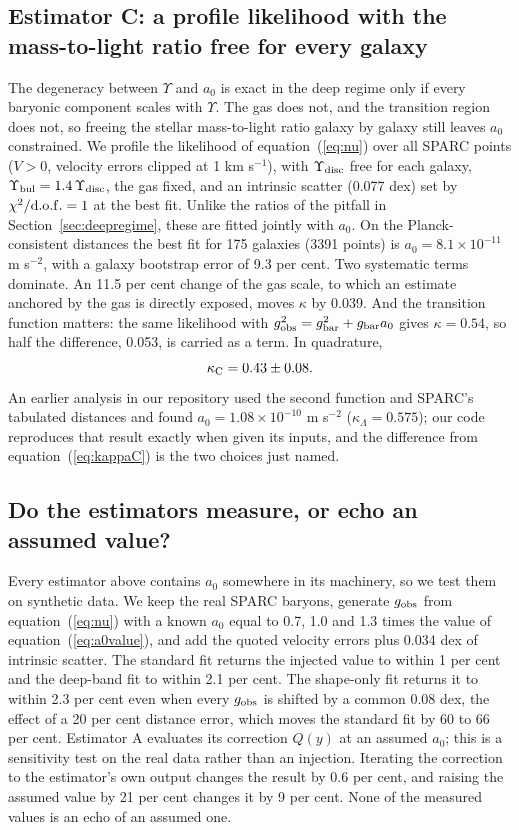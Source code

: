 \documentclass[fleqn,usenatbib]{mnras}
\begin{document}
\subsection{Estimator C: a profile likelihood with the mass-to-light ratio free for every galaxy}
\label{sec:profile}
The degeneracy between $\Upsilon$ and $a_0$ is exact in the deep regime only if every baryonic component scales with $\Upsilon$. The gas does not, and the transition region does not, so freeing the stellar mass-to-light ratio galaxy by galaxy still leaves $a_0$ constrained. We profile the likelihood of equation~(\ref{eq:nu}) over all SPARC points ($V>0$, velocity errors clipped at 1 km s$^{-1}$), with $\Upsilon_{\rm disc}$ free for each galaxy, $\Upsilon_{\rm bul}=1.4\,\Upsilon_{\rm disc}$, the gas fixed, and an intrinsic scatter (0.077 dex) set by $\chi^2/{\rm d.o.f.}=1$ at the best fit. Unlike the ratios of the pitfall in Section~\ref{sec:deepregime}, these are fitted jointly with $a_0$. On the Planck-consistent distances the best fit for 175 galaxies (3391 points) is $a_0=8.1\times10^{-11}$ m s$^{-2}$, with a galaxy bootstrap error of 9.3 per cent. Two systematic terms dominate. An 11.5 per cent change of the gas scale, to which an estimate anchored by the gas is directly exposed, moves $\kappa$ by 0.039. And the transition function matters: the same likelihood with $g_{\rm obs}^2=g_{\rm bar}^2+g_{\rm bar}a_0$ gives $\kappa=0.54$, so half the difference, 0.053, is carried as a term. In quadrature,
\begin{equation}
\kappa_{\rm C}=0.43\pm0.08 .
\label{eq:kappaC}
\end{equation}
An earlier analysis in our repository used the second function and SPARC's tabulated distances and found $a_0=1.08\times10^{-10}$ m s$^{-2}$ ($\kappa_\Lambda=0.575$); our code reproduces that result exactly when given its inputs, and the difference from equation~(\ref{eq:kappaC}) is the two choices just named.

\subsection{Do the estimators measure, or echo an assumed value?}
\label{sec:injection}
Every estimator above contains $a_0$ somewhere in its machinery, so we test them on synthetic data. We keep the real SPARC baryons, generate $g_{\rm obs}$ from equation~(\ref{eq:nu}) with a known $a_0$ equal to 0.7, 1.0 and 1.3 times the value of equation~(\ref{eq:a0value}), and add the quoted velocity errors plus 0.034 dex of intrinsic scatter. The standard fit returns the injected value to within 1 per cent and the deep-band fit to within 2.1 per cent. The shape-only fit returns it to within 2.3 per cent even when every $g_{\rm obs}$ is shifted by a common 0.08 dex, the effect of a 20 per cent distance error, which moves the standard fit by 60 to 66 per cent. Estimator A evaluates its correction $Q(y)$ at an assumed $a_0$; this is a sensitivity test on the real data rather than an injection. Iterating the correction to the estimator's own output changes the result by 0.6 per cent, and raising the assumed value by 21 per cent changes it by 9 per cent. None of the measured values is an echo of an assumed one.
\end{document}
